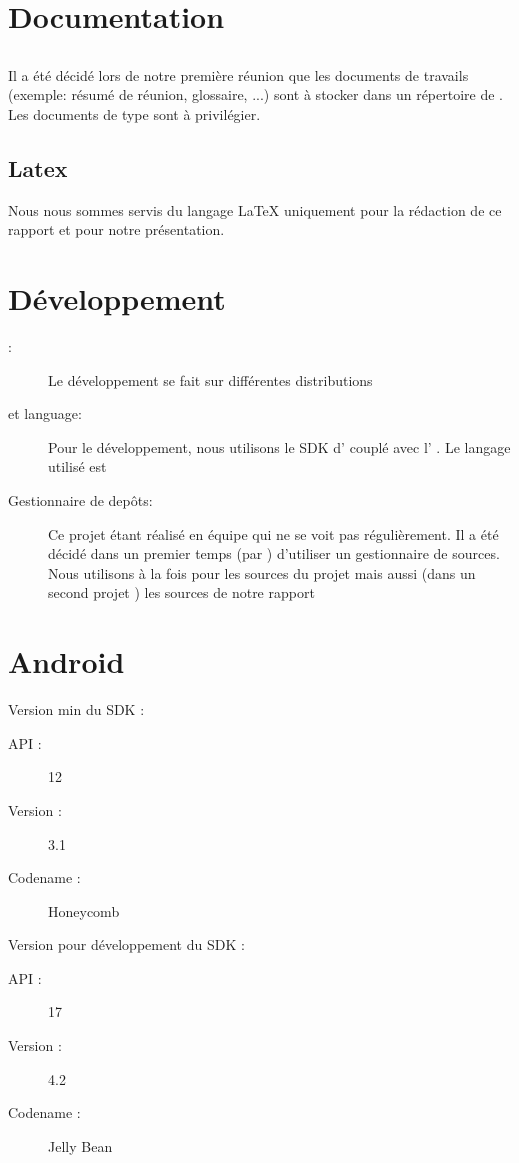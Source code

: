 \section{Documentation}
\subsection{\googleDrive}
Il a été décidé lors de notre première réunion
 que les documents de travails (exemple: résumé de réunion, glossaire, ...) sont à stocker dans un répertoire de \googleDrive{}. Les documents de type \og{}\google{}\fg{} sont à privilégier.
\subsection{Latex}
Nous nous sommes servis du langage \LaTeX{} uniquement pour la rédaction de ce rapport et pour notre présentation.
\section{Développement}
\begin{description}
\item[\os{}:] Le développement se fait sur différentes distributions \linux{}
\item[\ide{} et language:] Pour le développement, nous utilisons le SDK d'\android{} couplé avec l'\ide{} \eclipse{}. Le langage utilisé est \java{}
\item[Gestionnaire de depôts:] Ce projet étant réalisé en équipe qui ne se voit pas régulièrement. Il a été décidé dans un premier temps (par \responsableProjet{}) d'utiliser un gestionnaire de sources. Nous utilisons \github{} à la fois pour les sources du projet mais aussi (dans un second projet \github{}) les sources de notre rapport
\end{description}
\section{Android}
Version min du SDK :
\begin{description}
\item[API : ] 12
\item[Version : ] 3.1 
\item[Codename : ] Honeycomb 
\end{description}

Version pour développement du SDK :
\begin{description}
\item[API : ] 17
\item[Version : ] 4.2 
\item[Codename : ] Jelly Bean
\end{description}